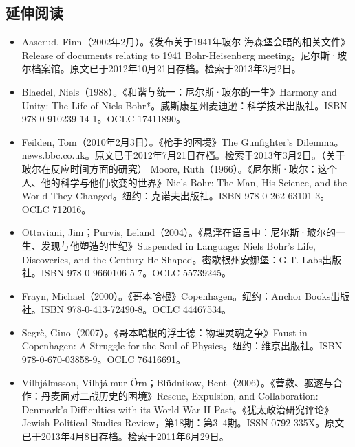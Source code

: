 \subsection{延伸阅读}
\begin{itemize}
\item Aaserud, Finn（2002年2月）。《发布关于1941年玻尔-海森堡会晤的相关文件》Release of documents relating to 1941 Bohr-Heisenberg meeting。尼尔斯·玻尔档案馆。原文已于2012年10月21日存档。检索于2013年3月2日。
\item Blaedel, Niels（1988）。《和谐与统一：尼尔斯·玻尔的一生》Harmony and Unity: The Life of Niels Bohr*。威斯康星州麦迪逊：科学技术出版社。ISBN 978-0-910239-14-1。OCLC 17411890。
\item Feilden, Tom（2010年2月3日）。《枪手的困境》The Gunfighter's Dilemma。news.bbc.co.uk。原文已于2012年7月21日存档。检索于2013年3月2日。（关于玻尔在反应时间方面的研究）
Moore, Ruth（1966）。《尼尔斯·玻尔：这个人、他的科学与他们改变的世界》Niels Bohr: The Man, His Science, and the World They Changed。纽约：克诺夫出版社。ISBN 978-0-262-63101-3。OCLC 712016。
\item Ottaviani, Jim；Purvis, Leland（2004）。《悬浮在语言中：尼尔斯·玻尔的一生、发现与他塑造的世纪》Suspended in Language: Niels Bohr's Life, Discoveries, and the Century He Shaped。密歇根州安娜堡：G.T. Labs出版社。ISBN 978-0-9660106-5-7。OCLC 55739245。
\item Frayn, Michael（2000）。《哥本哈根》Copenhagen。纽约：Anchor Books出版社。ISBN 978-0-413-72490-8。OCLC 44467534。
\item Segrè, Gino（2007）。《哥本哈根的浮士德：物理灵魂之争》Faust in Copenhagen: A Struggle for the Soul of Physics。纽约：维京出版社。ISBN 978-0-670-03858-9。OCLC 76416691。
\item Vilhjálmsson, Vilhjálmur Örn；Blüdnikow, Bent（2006）。《营救、驱逐与合作：丹麦面对二战历史的困境》Rescue, Expulsion, and Collaboration: Denmark's Difficulties with its World War II Past。《犹太政治研究评论》Jewish Political Studies Review，第18期：第3–4期。ISSN 0792-335X。原文已于2013年4月8日存档。检索于2011年6月29日。
\end{itemize}
